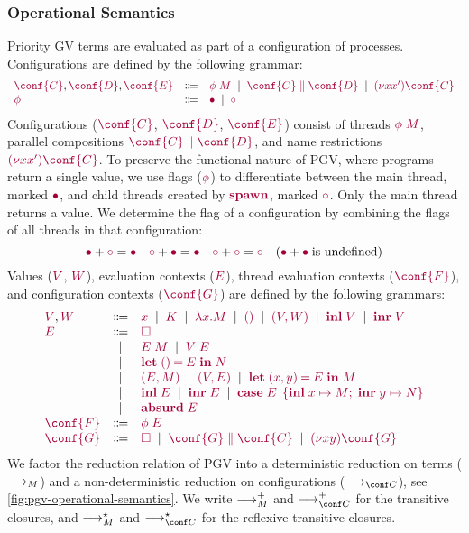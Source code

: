 \documentclass[main.tex]{subfiles}
\begin{document}
\subsubsection*{Operational Semantics}
Priority GV terms are evaluated as part of a configuration of processes. Configurations are defined by the following grammar:
\[
\begin{array}[t]{lcl}
    \tm{\conf{C}}, \tm{\conf{D}}, \tm{\conf{E}}
  & \Coloneqq & \tm{\phi\;M}
    \sep        \tm{\ppar{\conf{C}}{\conf{D}}}
    \sep        \tm{\res{x}{x'}{\conf{C}}}
  \\
  \tm{\phi}
  & \Coloneqq & \tm{\main}
    \sep        \tm{\child}
\end{array}
\]
Configurations ($\tm{\conf{C}}$, $\tm{\conf{D}}$, $\tm{\conf{E}}$) consist of threads $\tm{\phi\;M}$, parallel compositions $\tm{\ppar{\conf{C}}{\conf{D}}}$, and name restrictions $\tm{\res{x}{x'}{\conf{C}}}$. To preserve the functional nature of PGV, where programs return a single value, we use flags ($\tm{\phi}$) to differentiate between the main thread, marked $\tm{\main}$, and child threads created by $\tm{\spawn}$, marked $\tm{\child}$. Only the main thread returns a value. We determine the flag of a configuration by combining the flags of all threads in that configuration:
\[
  \tm{\main}  + \tm{\child} = \tm{\main}
  \quad
  \tm{\child} + \tm{\main}  = \tm{\main}
  \quad
  \tm{\child} + \tm{\child} = \tm{\child}
  \quad
  (\tm{\main}  + \tm{\main} \; \text{is undefined})
\]
Values ($\tm{V}$, $\tm{W}$), evaluation contexts ($\tm{E}$), thread evaluation contexts ($\tm{\conf{F}}$), and configuration contexts ($\tm{\conf{G}}$) are defined by the following grammars:
\[
\begin{array}[t]{lcl}
  \tm{V}, \tm{W}
  & \Coloneqq & \tm{x}
    \sep        \tm{K}
    \sep        \tm{\lambda x.M}
    \sep        \tm{\unit}
    \sep        \tm{\pair{V}{W}}
    \sep        \tm{\inl{V}}
    \sep        \tm{\inr{V}}
  \\
  \tm{E}
  & \Coloneqq & \tm{\hole} \\
  & \sep      & \tm{E\;M}
    \sep        \tm{V\;E} \\
  & \sep      & \tm{\letunit{E}{N}} \\
  & \sep      & \tm{\pair{E}{M}}
    \sep        \tm{\pair{V}{E}}
    \sep        \tm{\letpair{x}{y}{E}{M}} \\
  & \sep      & \tm{\inl{E}}
    \sep        \tm{\inr{E}}
    \sep        \tm{\casesum{E}{x}{M}{y}{N}} \\
  & \sep      & \tm{\absurd{E}}
  \\
  \tm{\conf{F}}
  & \Coloneqq & \tm{\phi\;E}
  \\
  \tm{\conf{G}}
  & \Coloneqq & \tm{\hole}
    \sep        \tm{\ppar{\conf{G}}{\conf{C}}}
    \sep        \tm{\res{x}{y}{\conf{G}}}
\end{array}
\]
We factor the reduction relation of PGV into a deterministic reduction on terms ($\longrightarrow_{M}$) and a non-deterministic reduction on configurations ($\cred$), see \cref{fig:pgv-operational-semantics}. We write $\longrightarrow_{M}^+$ and $\cred^+$ for the transitive closures, and $\longrightarrow_{M}^\star$ and $\cred^\star$ for the reflexive-transitive closures.
\end{document}
